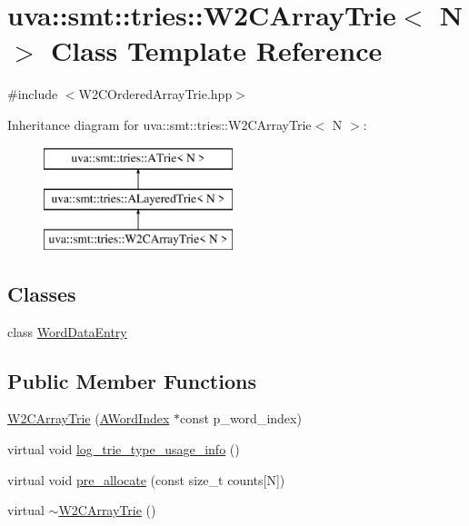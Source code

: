 \hypertarget{classuva_1_1smt_1_1tries_1_1_w2_c_array_trie}{}\section{uva\+:\+:smt\+:\+:tries\+:\+:W2\+C\+Array\+Trie$<$ N $>$ Class Template Reference}
\label{classuva_1_1smt_1_1tries_1_1_w2_c_array_trie}


{\ttfamily \#include $<$W2\+C\+Ordered\+Array\+Trie.\+hpp$>$}

Inheritance diagram for uva\+:\+:smt\+:\+:tries\+:\+:W2\+C\+Array\+Trie$<$ N $>$\+:\begin{figure}[H]
\begin{center}
\leavevmode
\includegraphics[height=3.000000cm]{classuva_1_1smt_1_1tries_1_1_w2_c_array_trie}
\end{center}
\end{figure}
\subsection*{Classes}
\begin{DoxyCompactItemize}
\item 
class \hyperlink{classuva_1_1smt_1_1tries_1_1_w2_c_array_trie_1_1_word_data_entry}{Word\+Data\+Entry}
\end{DoxyCompactItemize}
\subsection*{Public Member Functions}
\begin{DoxyCompactItemize}
\item 
\hyperlink{classuva_1_1smt_1_1tries_1_1_w2_c_array_trie_afeafd093ea21a2fcd22c12dc90364ee3}{W2\+C\+Array\+Trie} (\hyperlink{classuva_1_1smt_1_1tries_1_1dictionary_1_1_a_word_index}{A\+Word\+Index} $\ast$const p\+\_\+word\+\_\+index)
\item 
virtual void \hyperlink{classuva_1_1smt_1_1tries_1_1_w2_c_array_trie_a2137d9c6ffd08ca95bea39c7604f9b13}{log\+\_\+trie\+\_\+type\+\_\+usage\+\_\+info} ()
\item 
virtual void \hyperlink{classuva_1_1smt_1_1tries_1_1_w2_c_array_trie_ad8d923f41090aa99b3dc48e15ecb5182}{pre\+\_\+allocate} (const size\+\_\+t counts\mbox{[}N\mbox{]})
\item 
virtual \hyperlink{classuva_1_1smt_1_1tries_1_1_w2_c_array_trie_af57ae4d29719e1339aa2bfa8a744aee6}{$\sim$\+W2\+C\+Array\+Trie} ()
\end{DoxyCompactItemize}
